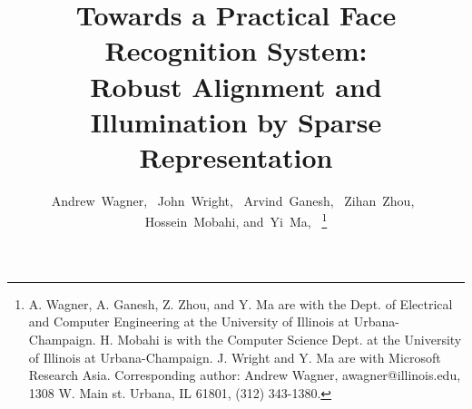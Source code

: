 \documentclass[12pt,journal,draftcls,letterpaper,onecolumn]{IEEEtran}
\begin{document}
%
\title{Towards a Practical Face Recognition System: \\ Robust Alignment and
Illumination by Sparse Representation}
%
\author{Andrew~Wagner,~
        John~Wright,~
        Arvind~Ganesh,~
        Zihan~Zhou,~
        Hossein~Mobahi,
        and~Yi~Ma,~%
\thanks{A. Wagner, A. Ganesh, Z. Zhou, and Y. Ma are with the Dept. of Electrical and Computer Engineering at the University of Illinois at Urbana-Champaign. H. Mobahi is with the Computer Science Dept. at the University of Illinois at Urbana-Champaign.  J. Wright and Y. Ma are with Microsoft Research Asia.  Corresponding author: Andrew Wagner, awagner@illinois.edu, 1308 W. Main st. Urbana, IL 61801, (312) 343-1380.}}%






\end{document}
